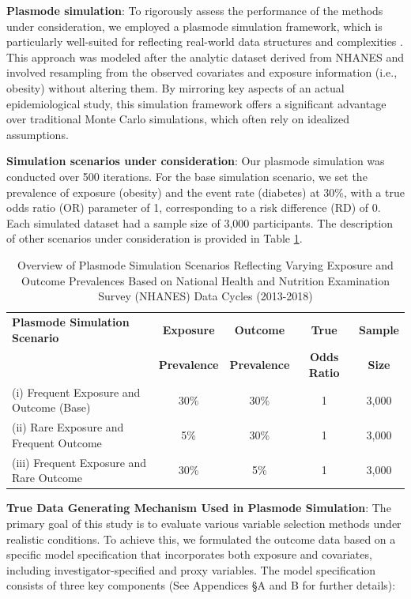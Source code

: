 \documentclass[sn-vancouver,Numbered,lineno,pdflatex]{sn-jnl}
\begin{document}
\textbf{Plasmode simulation}: To rigorously assess the performance of
the methods under consideration, we employed a plasmode simulation
framework, which is particularly well-suited for reflecting real-world
data structures and complexities \citep{franklin2014plasmode}. This
approach was modeled after the analytic dataset derived from NHANES and
involved resampling from the observed covariates and exposure
information (i.e., obesity) without altering them. By mirroring key
aspects of an actual epidemiological study, this simulation framework
offers a significant advantage over traditional Monte Carlo simulations,
which often rely on idealized assumptions.

\textbf{Simulation scenarios under consideration}: Our plasmode
simulation was conducted over 500 iterations. For the base simulation
scenario, we set the prevalence of exposure (obesity) and the event rate
(diabetes) at 30\%, with a true odds ratio (OR) parameter of 1,
corresponding to a risk difference (RD) of 0. Each simulated dataset had
a sample size of 3,000 participants. The description of other scenarios
under consideration is provided in Table \ref{table:scenarios}.

\begin{table}[ht]
\centering
\caption{Overview of Plasmode Simulation Scenarios Reflecting Varying Exposure and Outcome Prevalences Based on National Health and Nutrition Examination Survey (NHANES) Data Cycles (2013-2018)}
\label{table:scenarios}
\begin{tabular}{lcccc}
  \toprule
  \textbf{Plasmode Simulation Scenario} & \textbf{Exposure} & \textbf{Outcome} & \textbf{True} & \textbf{Sample}\\
  \textbf{} & \textbf{Prevalence} & \textbf{Prevalence} & \textbf{Odds Ratio} & \textbf{Size}\\
  \midrule
  (i) Frequent Exposure and Outcome (Base) & 30\% & 30\% & 1 & 3,000 \\
  (ii) Rare Exposure and Frequent Outcome & 5\% & 30\% & 1 & 3,000 \\
  (iii) Frequent Exposure and Rare Outcome & 30\% & 5\% & 1 & 3,000 \\
  \bottomrule
\end{tabular}
\end{table}

\textbf{True Data Generating Mechanism Used in Plasmode Simulation}: The
primary goal of this study is to evaluate various variable selection
methods under realistic conditions. To achieve this, we formulated the
outcome data based on a specific model specification that incorporates
both exposure and covariates, including investigator-specified and proxy
variables. The model specification consists of three key components (See
Appendices \S A and B for further details):
\end{document}
